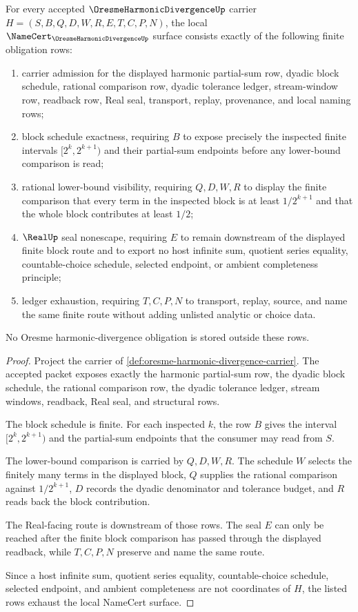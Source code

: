 \begin{theorem}
\label{thm:oresme-harmonic-divergence-namecert-obligations}
For every accepted $\OresmeHarmonicDivergenceUp$ carrier $H=(S,B,Q,D,W,R,E,T,C,P,N)$, the local $\NameCert_{\OresmeHarmonicDivergenceUp}$ surface consists exactly of the following finite obligation rows:
\begin{enumerate}
\item carrier admission for the displayed harmonic partial-sum row, dyadic block schedule, rational comparison row, dyadic tolerance ledger, stream-window row, readback row, Real seal, transport, replay, provenance, and local naming rows;
\item block schedule exactness, requiring $B$ to expose precisely the inspected finite intervals $[2^k,2^{k+1})$ and their partial-sum endpoints before any lower-bound comparison is read;
\item rational lower-bound visibility, requiring $Q,D,W,R$ to display the finite comparison that every term in the inspected block is at least $1/2^{k+1}$ and that the whole block contributes at least $1/2$;
\item $\RealUp$ seal nonescape, requiring $E$ to remain downstream of the displayed finite block route and to export no host infinite sum, quotient series equality, countable-choice schedule, selected endpoint, or ambient completeness principle;
\item ledger exhaustion, requiring $T,C,P,N$ to transport, replay, source, and name the same finite route without adding unlisted analytic or choice data.
\end{enumerate}
No Oresme harmonic-divergence obligation is stored outside these rows.
\end{theorem}
\begin{proof}
Project the carrier of \autoref{def:oresme-harmonic-divergence-carrier}. The accepted packet exposes exactly the harmonic partial-sum row, the dyadic block schedule, the rational comparison row, the dyadic tolerance ledger, stream windows, readback, Real seal, and structural rows.

The block schedule is finite. For each inspected $k$, the row $B$ gives the interval $[2^k,2^{k+1})$ and the partial-sum endpoints that the consumer may read from $S$.

The lower-bound comparison is carried by $Q,D,W,R$. The schedule $W$ selects the finitely many terms in the displayed block, $Q$ supplies the rational comparison against $1/2^{k+1}$, $D$ records the dyadic denominator and tolerance budget, and $R$ reads back the block contribution.

The Real-facing route is downstream of those rows. The seal $E$ can only be reached after the finite block comparison has passed through the displayed readback, while $T,C,P,N$ preserve and name the same route.

Since a host infinite sum, quotient series equality, countable-choice schedule, selected endpoint, and ambient completeness are not coordinates of $H$, the listed rows exhaust the local NameCert surface.
\end{proof}

